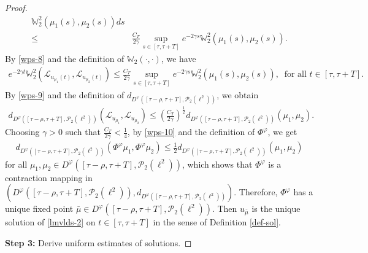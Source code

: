 \documentclass[11pt]{article}
\numberwithin{equation}{section}
\theoremstyle{plain}
\begin{document}
\begin{proof}
\begin{align}
                 \mathbb{W}^2_2(\mu_1(s), \mu_2(s)) ds  \nonumber \\
 \le & \frac{C_T}{2 \gamma}
        \sup_{s \in [\tau,\tau + T]} e^{-2 \gamma s} \mathbb{W}^2_2(\mu_1(s), \mu_2(s)).
 \end{align}
 By \eqref{wps-8} and the definition of $ \mathbb{W}_2(\cdot,\cdot)$,
 we have
 \begin{align}\label{wps-9}
    e^{-2 \gamma t}
    \mathbb{W}^2_2( \mathcal{L}_{u_{\mu_1}(t)}, \mathcal{L}_{u_{\mu_2}(t)} )
    \le \frac{C_T}{2 \gamma}
         \sup_{s \in [\tau, \tau + T]} e^{-2 \gamma s}
                 \mathbb{W}^2_2(\mu_1(s), \mu_2(s)),
                 \ 
         \text{ for all } t \in [\tau, \tau + T].
 \end{align}
 By \eqref{wps-9} and the definition of $ d_{D^\varphi([\tau-\rho,\tau + T], \mathcal{P}_2(\ell^2))}$,
 we obtain
 \begin{align}\label{wps-10}
    d_{D^\varphi([\tau-\rho,\tau + T], \mathcal{P}_2(\ell^2))}
       \left( \mathcal{L}_{u_{\mu_1}}, \mathcal{L}_{u_{\mu_2}} \right)
    \le \left( \frac{C_T}{2\gamma} \right)^{\frac{1}{2}}
         d_{D^\varphi([\tau-\rho,\tau + T], \mathcal{P}_2(\ell^2))}(\mu_1,\mu_2).
 \end{align}
 Choosing $\gamma > 0$ such that $\frac{C_T}{2\gamma} < \frac{1}{4}$,
 by \eqref{wps-10} and the definition of $\Phi^{\varphi}$,
 we get
 \begin{align*}
    d_{D^\varphi([\tau-\rho, \tau + T], \mathcal{P}_2(\ell^2))}
       \left( \Phi^{\varphi}\mu_1, \Phi^{\varphi}\mu_2 \right)
    \le \frac{1}{2} d_{D^\varphi([\tau-\rho, \tau + T], \mathcal{P}_2 (\ell^2))}(\mu_1,\mu_2)
 \end{align*}
 for all $\mu_1, \mu_2 \in D^\varphi([\tau-\rho,\tau + T], \mathcal{P}_2(\ell^2) )$,
 which shows that $\Phi^{\varphi}$ is a contraction mapping in
   $(D^\varphi([\tau-\rho,\tau + T], \mathcal{P}_2(\ell^2)), d_{D^\varphi([\tau-\rho,\tau + T], \mathcal{P}_2(\ell^2))})$.
 Therefore, $\Phi^{\varphi}$ has a unique fixed point
   $\bar{\mu} \in D^\varphi([\tau-\rho,\tau + T], \mathcal{P}_2(\ell^2)) $.
 Then $u_{\bar{\mu}}$ is 
 the unique  solution of \eqref{lmvlds-2} on $t \in [\tau,\tau + T]$ in the sense of Definition \ref{def-sol}.

 {\bf Step 3:} Derive uniform estimates of solutions.


\end{proof}
\end{document}
